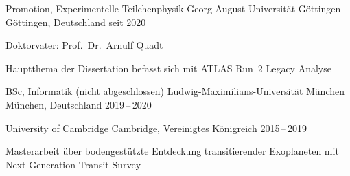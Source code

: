 \begin{cventries}
  \cventry%
    {Promotion, Experimentelle Teilchenphysik} %
    {Georg-August-Universit\"at G\"ottingen} %
    {G\"ottingen, Deutschland} %
    {seit 2020} %
    {%
      \begin{cvitems} %
        \item {Doktorvater: Prof.\ Dr.\ Arnulf Quadt}%
        \item {Hauptthema der Dissertation befasst sich mit ATLAS Run~2 \ttHbb Legacy Analyse}%
      \end{cvitems}%
    }%

  \cventry%
    {BSc, Informatik (nicht abgeschlossen)} %
    {Ludwig-Maximilians-Universit\"at M\"unchen} %
    {M\"unchen, Deutschland} %
    {2019\,--\,2020} %
    {}%

    {University of Cambridge} %
    {Cambridge, Vereinigtes K\"onigreich} %
    {2015\,--\,2019} %
    {%
      \begin{cvitems} %
        \item {%
          Masterarbeit \"uber bodengest\"utzte Entdeckung transitierender Exoplaneten mit Next-Generation Transit Survey
        }%
      \end{cvitems}%
    }%
\end{cventries}
